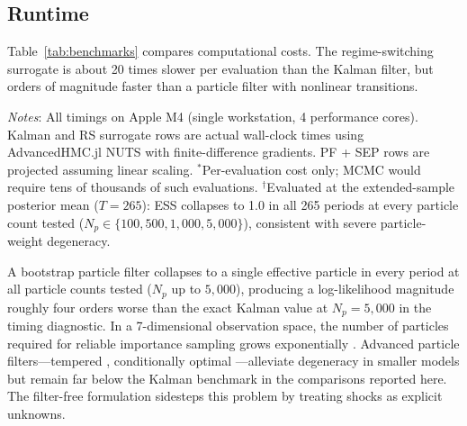 \documentclass[12pt]{article}
\theoremstyle{plain}
\theoremstyle{definition}
\theoremstyle{remark}
\newcommand{\tablenotes}[1]{%
  \par\vspace{0.5em}%
  \noindent\begin{minipage}{\textwidth}%
  \raggedright\footnotesize #1%
  \end{minipage}\par%
}
\begin{document}
\subsection{Runtime}
\label{subsec:results_hlt_runtime}

Table~\ref{tab:benchmarks} compares computational costs. The regime-switching surrogate is about 20 times slower per evaluation than the Kalman filter, but orders of magnitude faster than a particle filter with nonlinear transitions.

\begin{table}[htbp]
\centering
\caption{Computational Benchmark Comparison}
\label{tab:benchmarks}
\tablenotes{\textit{Notes}: All timings on Apple M4 (single workstation, 4 performance cores). Kalman and RS surrogate rows are actual wall-clock times using AdvancedHMC.jl NUTS with finite-difference gradients. PF + SEP rows are projected assuming linear scaling. $^*$Per-evaluation cost only; MCMC would require tens of thousands of such evaluations. $^\dagger$Evaluated at the extended-sample posterior mean ($T=265$): ESS collapses to 1.0 in all 265 periods at every particle count tested ($N_p \in \{100, 500, 1{,}000, 5{,}000\}$), consistent with severe particle-weight degeneracy.}
\end{table}

A bootstrap particle filter \citep{gordon1993novel} collapses to a single effective particle in every period at all particle counts tested ($N_p$ up to $5{,}000$), producing a log-likelihood magnitude roughly four orders worse than the exact Kalman value at $N_p=5{,}000$ in the timing diagnostic. In a 7-dimensional observation space, the number of particles required for reliable importance sampling grows exponentially \citep{snyder2008obstacles}. Advanced particle filters---tempered \citep{herbst2019tempered}, conditionally optimal \citep{aruoba2021piecewise}---alleviate degeneracy in smaller models but remain far below the Kalman benchmark in the comparisons reported here. The filter-free formulation sidesteps this problem by treating shocks as explicit unknowns.
\end{document}
